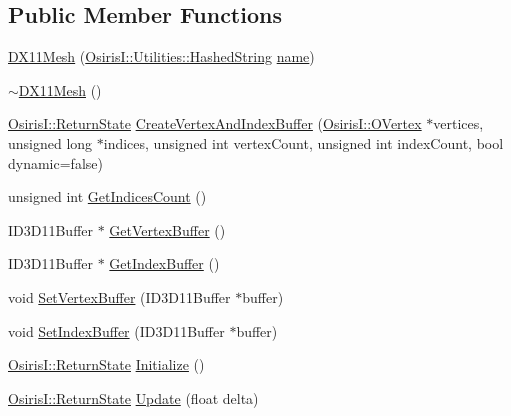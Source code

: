\subsection*{Public Member Functions}
\begin{DoxyCompactItemize}
\item 
\hyperlink{class_osiris_i_1_1_graphics_1_1_actors_1_1_d_x11_mesh_a7c3deee265f68bb301df43d28c597a2a}{D\-X11\-Mesh} (\hyperlink{class_osiris_i_1_1_utilities_1_1_hashed_string}{Osiris\-I\-::\-Utilities\-::\-Hashed\-String} \hyperlink{class_osiris_i_1_1_i_osiris_object_a6a3324b9c5ea3afabc9f3ffd9b666db9}{name})
\item 
\hyperlink{class_osiris_i_1_1_graphics_1_1_actors_1_1_d_x11_mesh_a9c11b4c11d595cfbc7778ffefb5bc3ea}{$\sim$\-D\-X11\-Mesh} ()
\item 
\hyperlink{namespace_osiris_i_a8f53bf938dc75c65c6a529694514013e}{Osiris\-I\-::\-Return\-State} \hyperlink{class_osiris_i_1_1_graphics_1_1_actors_1_1_d_x11_mesh_a0820551b14f107b29101b50a853401c4}{Create\-Vertex\-And\-Index\-Buffer} (\hyperlink{struct_osiris_i_1_1_o_vertex}{Osiris\-I\-::\-O\-Vertex} $\ast$vertices, unsigned long $\ast$indices, unsigned int vertex\-Count, unsigned int index\-Count, bool dynamic=false)
\item 
unsigned int \hyperlink{class_osiris_i_1_1_graphics_1_1_actors_1_1_d_x11_mesh_a24751caebe5ad10950e1c4eef3f2fdfe}{Get\-Indices\-Count} ()
\item 
I\-D3\-D11\-Buffer $\ast$ \hyperlink{class_osiris_i_1_1_graphics_1_1_actors_1_1_d_x11_mesh_ab8831414458b20fbef787afb96f6da4c}{Get\-Vertex\-Buffer} ()
\item 
I\-D3\-D11\-Buffer $\ast$ \hyperlink{class_osiris_i_1_1_graphics_1_1_actors_1_1_d_x11_mesh_aec5d07c2561d914f28bf501d2875f118}{Get\-Index\-Buffer} ()
\item 
void \hyperlink{class_osiris_i_1_1_graphics_1_1_actors_1_1_d_x11_mesh_afe50c768858ccd0ba983533215cce568}{Set\-Vertex\-Buffer} (I\-D3\-D11\-Buffer $\ast$buffer)
\item 
void \hyperlink{class_osiris_i_1_1_graphics_1_1_actors_1_1_d_x11_mesh_a5a36e6180ab9c5f0bbea16051c7f761f}{Set\-Index\-Buffer} (I\-D3\-D11\-Buffer $\ast$buffer)
\item 
\hyperlink{namespace_osiris_i_a8f53bf938dc75c65c6a529694514013e}{Osiris\-I\-::\-Return\-State} \hyperlink{class_osiris_i_1_1_graphics_1_1_actors_1_1_d_x11_mesh_a5a9042be6f707a0c79655a6dcbf7c284}{Initialize} ()
\item 
\hyperlink{namespace_osiris_i_a8f53bf938dc75c65c6a529694514013e}{Osiris\-I\-::\-Return\-State} \hyperlink{class_osiris_i_1_1_graphics_1_1_actors_1_1_d_x11_mesh_a9f20637baf929f8ad28b6aab0aff3a4e}{Update} (float delta)

\end{DoxyCompactItemize}
